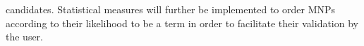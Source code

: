 \begin{enumerate}
  candidates. Statistical measures will further be implemented to
  order MNPs according to their likelihood to be a term in order to
  facilitate their validation by the user. 
\end{enumerate}
